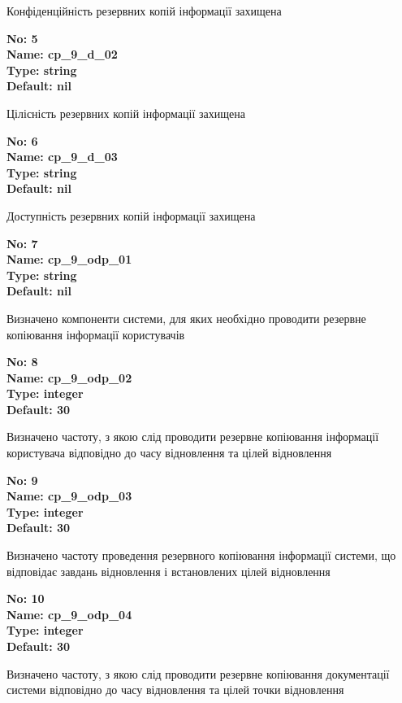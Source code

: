 \documentclass{article}
\begin{document}
{\footnotesize Конфіденційність резервних копій інформації захищена}


{\footnotesize\bfseries
No: 5\\
Name: cp\_\allowbreak{}9\_\allowbreak{}d\_\allowbreak{}02\\
Type: string\\
Default: nil
}

{\footnotesize Цілісність резервних копій інформації захищена}


{\footnotesize\bfseries
No: 6\\
Name: cp\_\allowbreak{}9\_\allowbreak{}d\_\allowbreak{}03\\
Type: string\\
Default: nil
}

{\footnotesize Доступність резервних копій інформації захищена}


{\footnotesize\bfseries
No: 7\\
Name: cp\_\allowbreak{}9\_\allowbreak{}odp\_\allowbreak{}01\\
Type: string\\
Default: nil
}

{\footnotesize Визначено компоненти системи, для яких необхідно проводити резервне копіювання інформації користувачів}


{\footnotesize\bfseries
No: 8\\
Name: cp\_\allowbreak{}9\_\allowbreak{}odp\_\allowbreak{}02\\
Type: integer\\
Default: 30
}

{\footnotesize Визначено частоту, з якою слід проводити резервне копіювання інформації користувача відповідно до часу відновлення та цілей відновлення}


{\footnotesize\bfseries
No: 9\\
Name: cp\_\allowbreak{}9\_\allowbreak{}odp\_\allowbreak{}03\\
Type: integer\\
Default: 30
}

{\footnotesize Визначено частоту проведення резервного копіювання інформації системи, що відповідає завдань відновлення і встановлених цілей відновлення}


{\footnotesize\bfseries
No: 10\\
Name: cp\_\allowbreak{}9\_\allowbreak{}odp\_\allowbreak{}04\\
Type: integer\\
Default: 30
}

{\footnotesize Визначено частоту, з якою слід проводити резервне копіювання документації системи відповідно до часу відновлення та цілей точки відновлення}
\end{document}
